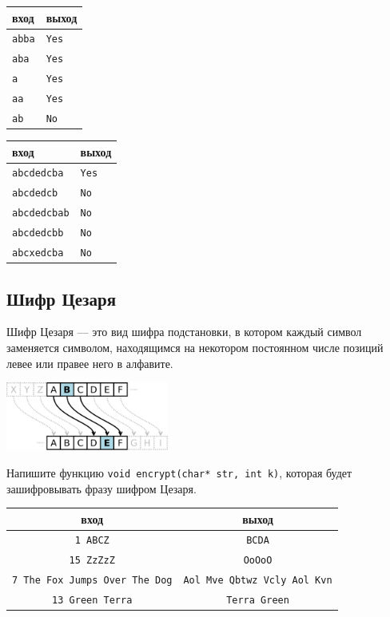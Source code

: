 \documentclass[10pt]{article}
\begin{document}
\begin{multicols}{2}
\begin{center}
\begin{tabular}{ l | l }
 вход & выход \\ \hline
 \texttt{abba} & \texttt{Yes} \\
 \texttt{aba} & \texttt{Yes} \\
 \texttt{a} & \texttt{Yes} \\
 \texttt{aa} & \texttt{Yes} \\
 \texttt{ab} & \texttt{No} 
\end{tabular}
\end{center}


\begin{center}
\begin{tabular}{ l | l }
 вход & выход \\ \hline
 \texttt{abcdedcba} & \texttt{Yes} \\
 \texttt{abcdedcb} & \texttt{No} \\
 \texttt{abcdedcbab} & \texttt{No} \\
 \texttt{abcdedcbb} & \texttt{No} \\
 \texttt{abcxedcba} & \texttt{No}
\end{tabular}
\end{center}
\end{multicols}


\subsection{Шифр Цезаря}
Шифр Цезаря — это вид шифра подстановки, в котором каждый символ заменяется символом, находящимся на некотором постоянном числе позиций левее или правее него в алфавите. 
\begin{center}
\includegraphics[width=0.4\textwidth]{../images/caesar.png}
\end{center}
Напишите функцию \texttt{void encrypt(char* str, int k)}, которая будет зашифровывать фразу шифром Цезаря.
\begin{center}
\begin{tabular}{ c | c }
 вход & выход \\ \hline
 \texttt{1 ABCZ} & \texttt{BCDA}\\
 \texttt{15 ZzZzZ} & \texttt{OoOoO} \\
 \texttt{7 The Fox Jumps Over The Dog} & \texttt{Aol Mve Qbtwz Vcly Aol Kvn} \\
 \texttt{13  Green Terra} & \texttt{Terra Green}
\end{tabular}
\end{center}
\end{document}

